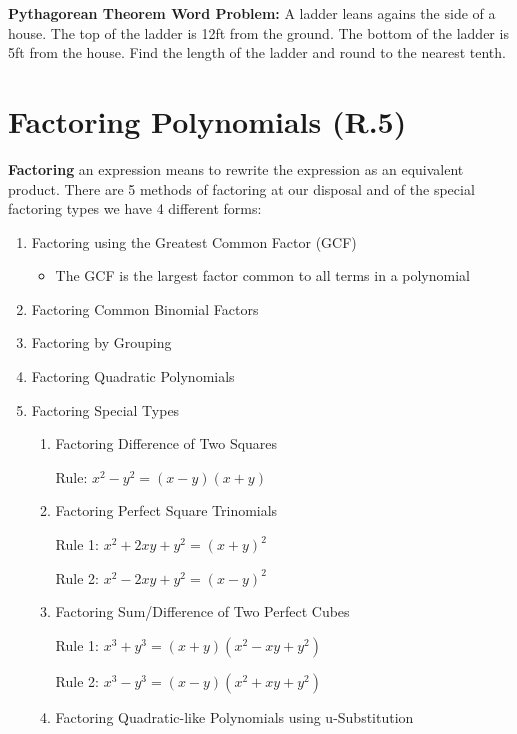 \documentclass[12pt]{article}
\begin{document}
\textbf{Pythagorean Theorem Word Problem:} A ladder leans agains the side of a house. The top of the ladder is 12ft from the ground. The bottom of the ladder is 5ft from the house. Find the length of the ladder and round to the nearest tenth.

\vspace{6cm}

\section{Factoring Polynomials (R.5)}

\textbf{Factoring} an expression means to rewrite the expression as an equivalent product. There are 5 methods of factoring at our disposal and of the special factoring types we have 4 different forms:

\begin{enumerate}

\item Factoring using the Greatest Common Factor (GCF)

\begin{itemize}

\item The GCF is the largest factor common to all terms in a polynomial

\end{itemize}

\item Factoring Common Binomial Factors
\item Factoring by Grouping
\item Factoring Quadratic Polynomials
\item Factoring Special Types

\begin{enumerate}

\item Factoring Difference of Two Squares
\newline

\centerline{Rule: $x^2 - y^2 = (x-y)(x+y)$}

\item Factoring Perfect Square Trinomials
\newline

\centerline{Rule 1: $x^2 + 2xy + y^2 = (x+y)^2$}

\centerline{Rule 2: $x^2 - 2xy + y^2 = (x-y)^2$}

\item Factoring Sum/Difference of Two Perfect Cubes
\newline

\centerline{Rule 1: $x^3 + y^3 = (x+y)(x^2 - xy + y^2)$}

\centerline{Rule 2: $x^3 - y^3 = (x-y)(x^2 + xy + y^2)$}

\item Factoring Quadratic-like Polynomials using u-Substitution

\end{enumerate}

\end{enumerate}
\end{document}
